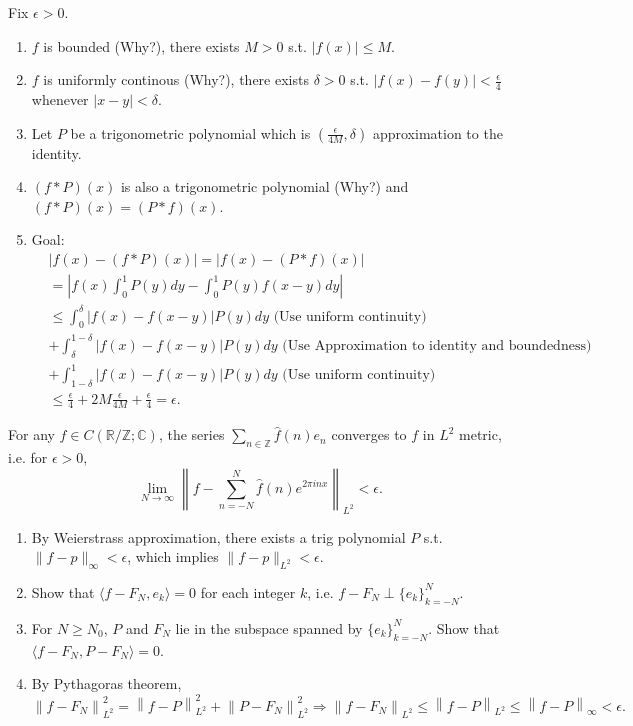 \documentclass[12pt]{article}
\begin{document}
\begin{pfbox}
Fix $\epsilon>0$.
\begin{enumerate}
    \item $f$ is bounded (Why?), there exists $M>0$ s.t. $|f(x)|\leq M$.
    \item $f$ is uniformly continous (Why?), there exists $\delta>0$ s.t. $|f(x)-f(y)|<\frac{\epsilon}{4}$ whenever $|x-y|<\delta$.
    \item Let $P$ be a trigonometric polynomial which is $(\frac{\epsilon}{4M},\delta)$ approximation to the identity.
    \item $(f*P)(x)$ is also a trigonometric polynomial (Why?) and $(f*P)(x) = (P*f)(x)$.
    \item Goal:
    \begin{align*}
    &\left|f(x)-(f*P)(x)\right| = \left|f(x)-(P*f)(x)\right| \\
    &= \left| f(x) \int_{0}^{1} P(y)dy - \int_{0}^{1}P(y)f(x-y)dy\right|\\
    &\leq \int_{0}^{\delta}\left|f(x)-f(x-y)\right|P(y)dy \text{ (Use uniform continuity)}\\
    &+ \int_{\delta}^{1-\delta}\left|f(x)-f(x-y)\right|P(y)dy \text{ (Use Approximation to identity and boundedness)}\\
    &+\int_{1-\delta}^{1}\left|f(x)-f(x-y)\right|P(y)dy \text{ (Use uniform continuity)}\\
    &\le \frac{\epsilon}{4} + 2M\frac{\epsilon}{4M} + \frac{\epsilon}{4} =\epsilon.
    \end{align*}
\end{enumerate}
\end{pfbox}

\begin{theorem}
    For any $f \in C(\mathbb{R}/\mathbb{Z}; \mathbb{C})$, the series $\sum_{n\in\mathbb{Z}}\hat{f}(n)e_n$ converges to $f$ in $L^2$ metric,
    i.e. for $\epsilon>0,$
    \[\lim_{N\rightarrow\infty}\left\|f-\sum_{n=-N}^{N}\hat{f}(n)e^{2\pi inx}\right\|_{L^2}<\epsilon.\]
\end{theorem}

\begin{pfbox}
    \begin{enumerate}
        \item By Weierstrass approximation, there exists a trig polynomial $P$ s.t. $\| f-p \|_{\infty}<\epsilon$, which implies $\| f-p \|_{L^2}<\epsilon$.
        \item Show that $\langle f-F_N, e_k\rangle = 0$ for each integer $k$, i.e. $f-F_N\perp \{e_k\}^{N}_{k=-N}$.
        \item For $N\ge N_0$, $P$ and $F_N$ lie in the subspace spanned by $\{e_k\}^{N}_{k=-N}$. Show that $\langle f-F_N, P-F_N\rangle = 0.$
        \item By Pythagoras theorem, $\left\|f-F_N\right\|^2_{L^2} = \left\|f-P\right\|^2_{L^2} + \left\|P-F_N\right\|^2_{L^2} \Rightarrow \left\|f-F_N\right\|_{L^2} \le \left\|f-P\right\|_{L^2} \le \left\|f-P\right\|_{\infty}<\epsilon.$
    \end{enumerate}
\end{pfbox}
\end{document}
